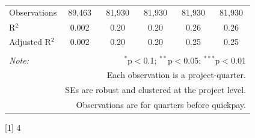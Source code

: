 \documentclass[
]{article}
\begin{document}
\begin{table}[H]
\begin{tabular}{@{\extracolsep{-2pt}}lccccc}
Observations & 89,463 & 81,930 & 81,930 & 81,930 & 81,930 \\ 
R$^{2}$ & 0.002 & 0.20 & 0.20 & 0.26 & 0.26 \\ 
Adjusted R$^{2}$ & 0.002 & 0.20 & 0.20 & 0.25 & 0.25 \\ 
\hline 
\hline \\[-1.8ex] 
\textit{Note:}  & \multicolumn{5}{r}{$^{*}$p$<$0.1; $^{**}$p$<$0.05; $^{***}$p$<$0.01} \\ 
 & \multicolumn{5}{r}{Each observation is a project-quarter.} \\ 
 & \multicolumn{5}{r}{SEs are robust and clustered at the project level.} \\ 
 & \multicolumn{5}{r}{Observations are for quarters before quickpay.} \\ 
\end{tabular} 
\end{table}

{[}1{]} 4
\end{document}

